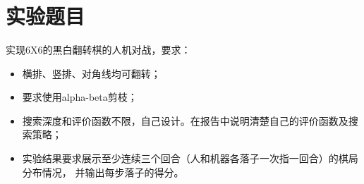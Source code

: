 \documentclass[10pt,letterpaper]{ctexart}
\begin{document}
\pagestyle{plain}
\title{
    \begin{center}
        \phantom{Start!}
    	  \vspace{2cm}
    \end{center}
}
\maketitle

\begin{center}
    \setlength{\baselineskip}{40pt}
    \vspace{1cm}
\end{center}
\pagebreak

\section{实验题目}
实现6X6的黑白翻转棋的人机对战，要求：
\begin{itemize}[itemindent=1.5em]
  \item 横排、竖排、对角线均可翻转；
  \item 要求使用alpha-beta剪枝；
  \item 搜索深度和评价函数不限，自己设计。在报告中说明清楚自己的评价函数及搜索策略；
  \item 实验结果要求展示至少连续三个回合（人和机器各落子一次指一回合）的棋局分布情况，
  并输出每步落子的得分。
\end{itemize}
\end{document}
